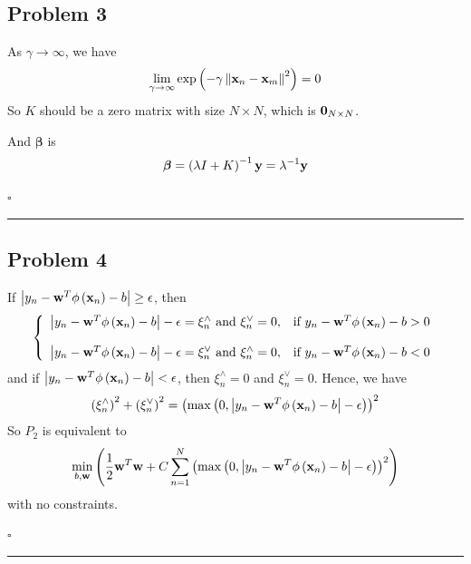 \documentclass[12pt]{article}
\newcommand*{\QEDB}{\hfill\ensuremath{\square}}
\newcommand{\ParTh}[1]{\left(#1\right)}
\newcommand{\BF}[1]{{\bf#1}}
\newcommand{\AbsVal}[1]{\left|#1\right|}
\newcommand{\VecAbsVal}[1]{\left\|#1\right\|}
\newcommand{\horrule}[1]{\rule{\linewidth}{#1}}
\begin{document}
\subsection*{Problem 3}

As $\gamma\rightarrow\infty$, we have
\begin{align}
\lim\limits_{\gamma\rightarrow\infty}\exp\ParTh{-\gamma\VecAbsVal{\BF{x}_n-\BF{x}_m}^2}=0
\end{align}
So $K$ should be a zero matrix with size $N\times N$, which is $\BF{0}_{N\times N}$.

And $\bm{\beta}$ is
\begin{align}
\bm{\beta}=\ParTh{\lambda I+K}^{-1}\BF{y}=\lambda^{-1}\BF{y}
\end{align}

\QEDB

\horrule{0.5pt}

\subsection*{Problem 4}

If $\AbsVal{y_n-\BF{w}^T\phi\ParTh{\BF{x}_n}-b}\geq\epsilon$, then
\begin{align}
\left\{
\begin{array}{ll}
\AbsVal{y_n-\BF{w}^T\phi\ParTh{\BF{x}_n}-b}-\epsilon=\xi^{\wedge}_n\text{ and }\xi^{\vee}_n=0,&\text{if }y_n-\BF{w}^T\phi\ParTh{\BF{x}_n}-b>0\\\\
\AbsVal{y_n-\BF{w}^T\phi\ParTh{\BF{x}_n}-b}-\epsilon=\xi^{\vee}_n\text{ and }\xi^{\wedge}_n=0,&\text{if }y_n-\BF{w}^T\phi\ParTh{\BF{x}_n}-b<0
\end{array}
\right.
\end{align}
 and if $\AbsVal{y_n-\BF{w}^T\phi\ParTh{\BF{x}_n}-b}<\epsilon$, then $\xi^{\wedge}_n=0$ and $\xi^{\vee}_n=0$.
Hence, we have
\begin{align}
\ParTh{\xi^\wedge_n}^2+\ParTh{\xi^\vee_n}^2=\ParTh{\max\ParTh{0,\AbsVal{y_n-\BF{w}^T\phi\ParTh{\BF{x}_n}-b}-\epsilon}}^2
\end{align}
So $P_2$ is equivalent to
\begin{align}
\min_{b,\BF{w}}\ParTh{\dfrac{1}{2}\BF{w}^T\BF{w}+C\sum_{n=1}^{N}\ParTh{\max\ParTh{0,\AbsVal{y_n-\BF{w}^T\phi\ParTh{\BF{x}_n}-b}-\epsilon}}^2}
\end{align}
with no constraints.

\QEDB

\horrule{0.5pt}
\end{document}
